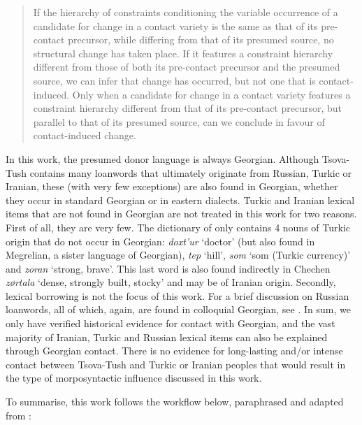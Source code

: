 \begin{quote}
	If the hierarchy of constraints conditioning the variable occurrence of a candidate for change in a contact variety is the same as that of its pre-contact precursor, while differing from that of its presumed source, no structural change has taken place. If it features a constraint hierarchy different from those of both its pre-contact precursor and the presumed source, we can infer that change has occurred, but not one that is contact-induced. Only when a candidate for change in a contact variety features a constraint hierarchy different from that of its pre-contact precursor, but parallel to that of its presumed source, can we conclude in favour of contact-induced change.
\end{quote}

In this work, the presumed donor language is always Georgian. Although Tsova-Tush contains many loanwords that ultimately originate from Russian, Turkic or Iranian, these (with very few exceptions) are also found in Georgian, whether they occur in standard Georgian or in eastern dialects. Turkic and Iranian lexical items that are not found in Georgian are not treated in this work for two reasons. First of all, they are very few. The dictionary of \textcite{kadkad84} only contains 4 nouns of Turkic origin that do not occur in Georgian: \textit{doxt'ur} `doctor' (but also found in Megrelian, a sister language of Georgian), \textit{tep} `hill', \textit{som} `som (Turkic currency)' and \textit{zoran} `strong, brave'. This last word is also found indirectly in Chechen \textit{zørtala} `dense, strongly built, stocky' and may be of Iranian origin. Secondly, lexical borrowing is not the focus of this work. For a brief discussion on Russian loanwords, all of which, again, are found in colloquial Georgian, see \textcite{WS}. In sum, we only have verified historical evidence for contact with Georgian, and the vast majority of Iranian, Turkic and Russian lexical items can also be explained through Georgian contact. There is no evidence for long-lasting and/or intense contact between Tsova-Tush and Turkic or Iranian peoples that would result in the type of morposyntactic influence discussed in this work.



To summarise, this work follows the workflow below, paraphrased and adapted from \textcite[93--94]{thomason2001contacthandbook}:

